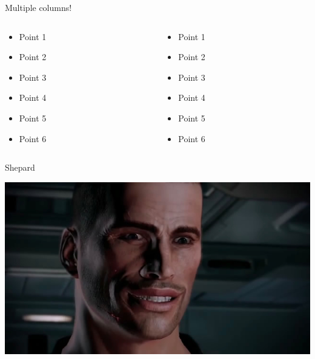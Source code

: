 \documentclass{beamer}
\begin{document}
\begin{frame}{Multiple columns!}
	\begin{columns}
		\begin{column}{0.27\textwidth}
			\begin{itemize}
				\item Point 1 \pause
				\item Point 2 \pause
				\item Point 3 \pause
				\item Point 4 \pause
				\item Point 5 \pause
				\item Point 6
			\end{itemize}
		\end{column}
		\begin{column}{0.67\textwidth}
			\begin{itemize}
				\item Point 1 \pause
				\item Point 2 \pause
				\item Point 3 \pause
				\item Point 4 \pause
				\item Point 5 \pause
				\item Point 6
			\end{itemize}
		\end{column}
	\end{columns}
\end{frame}

\begin{frame}{Shepard}
	\begin{center}
		\includegraphics[width=\textwidth]{shepard}
	\end{center}
\end{frame}
\end{document}
